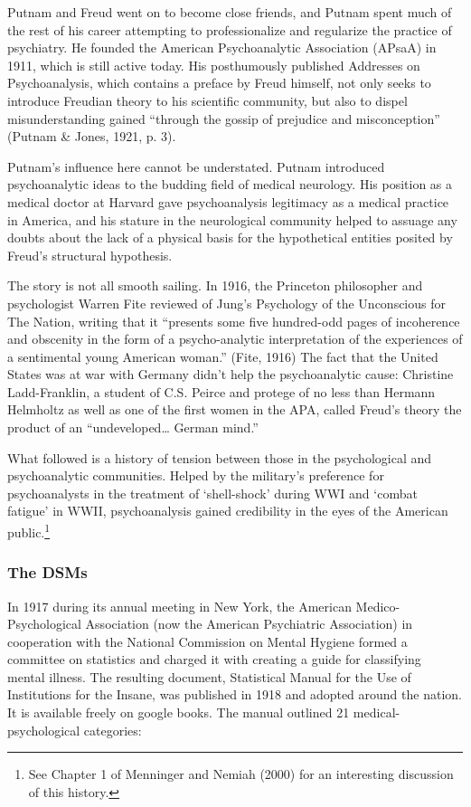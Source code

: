 Putnam and Freud went on to become close friends, and Putnam spent much of the rest of his career attempting to professionalize and regularize the practice of psychiatry. He founded the American Psychoanalytic Association (APsaA) in 1911, which is still active today. His posthumously published Addresses on Psychoanalysis, which contains a preface by Freud himself, not only seeks to introduce Freudian theory to his scientific community, but also to dispel misunderstanding gained “through the gossip of prejudice and misconception” (Putnam \& Jones, 1921, p. 3).

Putnam’s influence here cannot be understated. Putnam introduced psychoanalytic ideas to the budding field of medical neurology. His position as a medical doctor at Harvard gave psychoanalysis legitimacy as a medical practice in America, and his stature in the neurological community helped to assuage any doubts about the lack of a physical basis for the hypothetical entities posited by Freud's structural hypothesis.

The story is not all smooth sailing. In 1916, the Princeton philosopher and psychologist Warren Fite reviewed of Jung's Psychology of the Unconscious for The Nation, writing that it “presents some five hundred-odd pages of incoherence and obscenity in the form of a psycho-analytic interpretation of the experiences of a sentimental young American woman.” (Fite, 1916) The fact that the United States was at war with Germany didn't help the psychoanalytic cause: Christine Ladd-Franklin, a student of C.S. Peirce and protege of no less than Hermann Helmholtz as well as one of the first women in the APA, called Freud's theory the product of an “undeveloped{\ldots} German mind.”

What followed is a history of tension between those in the psychological and psychoanalytic communities. Helped by the military's preference for psychoanalysts in the treatment of `shell-shock' during WWI and `combat fatigue' in WWII, psychoanalysis gained credibility in the eyes of the American public.\footnote{See Chapter 1 of Menninger and Nemiah (2000) for an interesting discussion of this history.}

\subsubsection{The DSMs}
\label{thedsms}

In 1917 during its annual meeting in New York, the American Medico-Psychological Association (now the American Psychiatric Association) in cooperation with the National Commission on Mental Hygiene formed a committee on statistics and charged it with creating a guide for classifying mental illness. The resulting document, Statistical Manual for the Use of Institutions for the Insane, was published in 1918 and adopted around the nation. It is available freely on google books. The manual outlined 21 medical-psychological categories:

